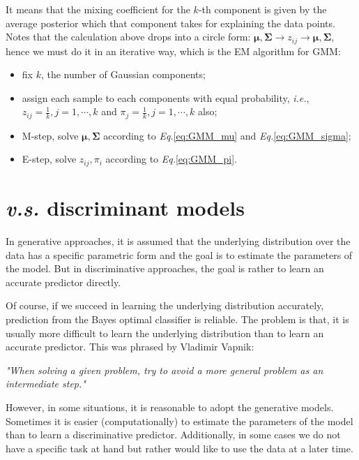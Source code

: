 \documentclass{article}
\begin{document}
	It means that the mixing coefficient for the $k$-th component is given by the average posterior which that component takes for explaining the data points. Notes that the calculation above drops into a circle form: $\bm{\mu}, \bm{\Sigma} \rightarrow z_{ij} \rightarrow \bm{\mu}, \bm{\Sigma}$, hence we must do it in an iterative way, which is the EM algorithm for GMM:
	\begin{shaded}
    \begin{itemize}
	\item fix $k$, the number of Gaussian components;
	\item assign each sample to each components with equal probability, \textit{i.e.}, $z_{ij}=\frac{1}{k},j=1,\cdots,k$ and $\pi_j=\frac{1}{k},j=1,\cdots,k$ also;
	\item M-step, solve $\bm{\mu}, \bm{\Sigma}$ according to \textit{Eq.}\ref{eq:GMM_mu} and \textit{Eq.}\ref{eq:GMM_sigma};
	\item E-step, solve $z_{ij},\pi_i$ according to \textit{Eq.}\ref{eq:GMM_pi}.
	\end{itemize}
  	\end{shaded}

		
\section{\textit{v.s.} discriminant models}
	\label{sec:final}
	In generative approaches, it is assumed that the underlying distribution over the data has a specific parametric form and the goal is to estimate the parameters of the model. But in discriminative approaches, the goal is rather to learn an accurate predictor directly. 
	
	Of course, if we succeed in learning the underlying distribution accurately, prediction from the Bayes optimal classifier is reliable. The problem is that, it is usually more difficult to learn the underlying distribution than to learn an accurate predictor. This was phrased by Vladimir Vapnik:
	\begin{center}
	\textit{"When solving a given problem, try to avoid a more general problem as an intermediate step."}
	\end{center}

	However, in some situations, it is reasonable to adopt the generative models. Sometimes it is easier (computationally) to estimate the parameters of the model than to learn a discriminative predictor. Additionally, in some cases we do not have a specific task at hand but rather would like to use the data at a later time.
	
\end{document}
